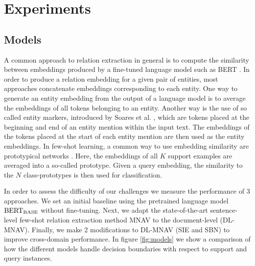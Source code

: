 \documentclass[11pt]{article}
\begin{document}
\begin{figure*}
    \centering
    \caption{Embedding space illustration of the different models used for evaluation \textit{at inference time}. Shown in (a) are all data points available from support documents, as well as the query instance. Class prototypes in (b) are computed as mean of support relation instances. Learned NOTA vectors, shown in red, are not based on support NOTA instances but learned during training and do not change based on the support document. Dotted lines indicate distances affecting the classification of the query instance, shown in white. Background colors illustrate approximate classification boundaries. For the baseline model (\ref{subsection:baseline}), decision boundaries are the same as in (d).}
    \label{fig:models}
\end{figure*}
\section{Experiments}
\label{sec:experiments}
\subsection{Models}

A common approach to relation extraction in general is to compute the similarity between embeddings produced by a fine-tuned language model such as BERT \cite{devlin_bert_2019}. 
In order to produce a relation embedding for a given pair of entities, most approaches concatenate embeddings corresponding to each entity.
One way to generate an entity embedding from the output of a language model is to average the embeddings of all tokens belonging to an entity.
Another way is the use of so called entity markers, introduced by Soares et al. \cite{soares_matching_2019}, which are tokens placed at the beginning and end of an entity mention within the input text.
The embeddings of the tokens placed at the start of each entity mention are then used as the entity embeddings.
In few-shot learning, a common way to use embedding similarity are prototypical networks \cite{snell_prototypical_2017}. 
Here, the embeddings of all $K$ support examples are averaged into a so-called prototype.
Given a query embedding, the similarity to the $N$ class-prototypes is then used for classification.

In order to assess the difficulty of our challenges we measure the performance of 3 approaches.
We set an initial baseline using the pretrained language model ${\textnormal{BERT}}_{\textnormal{BASE}}$ \cite{devlin_bert_2019} without fine-tuning.
Next, we adapt the state-of-the-art sentence-level few-shot relation extraction method MNAV \cite{sabo_revisiting_2021} to the document-level (DL-MNAV).
Finally, we make 2 modifications to DL-MNAV (SIE and SBN) to improve cross-domain performance.
In figure \ref{fig:models} we show a comparison of how the different models handle decision boundaries with respect to support and query instances.
\end{document}
